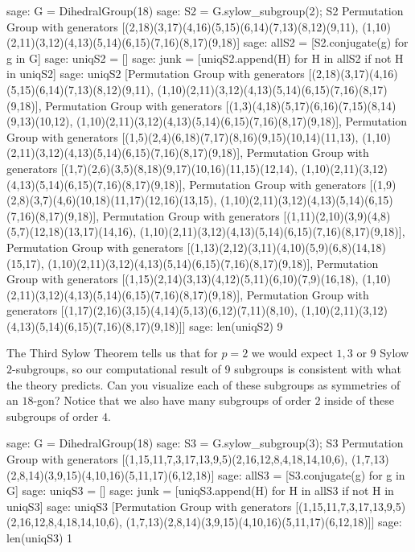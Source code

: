 \begin{sageexample}
sage: G = DihedralGroup(18)
sage: S2 = G.sylow_subgroup(2); S2
Permutation Group with generators
  [(2,18)(3,17)(4,16)(5,15)(6,14)(7,13)(8,12)(9,11),
   (1,10)(2,11)(3,12)(4,13)(5,14)(6,15)(7,16)(8,17)(9,18)]
sage: allS2 = [S2.conjugate(g) for g in G]
sage: uniqS2 = []
sage: junk = [uniqS2.append(H) for H in allS2 if not H in uniqS2]
sage: uniqS2
[Permutation Group with generators
   [(2,18)(3,17)(4,16)(5,15)(6,14)(7,13)(8,12)(9,11),
    (1,10)(2,11)(3,12)(4,13)(5,14)(6,15)(7,16)(8,17)(9,18)],
 Permutation Group with generators
   [(1,3)(4,18)(5,17)(6,16)(7,15)(8,14)(9,13)(10,12),
    (1,10)(2,11)(3,12)(4,13)(5,14)(6,15)(7,16)(8,17)(9,18)],
 Permutation Group with generators
   [(1,5)(2,4)(6,18)(7,17)(8,16)(9,15)(10,14)(11,13),
    (1,10)(2,11)(3,12)(4,13)(5,14)(6,15)(7,16)(8,17)(9,18)],
 Permutation Group with generators
   [(1,7)(2,6)(3,5)(8,18)(9,17)(10,16)(11,15)(12,14),
    (1,10)(2,11)(3,12)(4,13)(5,14)(6,15)(7,16)(8,17)(9,18)],
 Permutation Group with generators
   [(1,9)(2,8)(3,7)(4,6)(10,18)(11,17)(12,16)(13,15),
    (1,10)(2,11)(3,12)(4,13)(5,14)(6,15)(7,16)(8,17)(9,18)],
 Permutation Group with generators
   [(1,11)(2,10)(3,9)(4,8)(5,7)(12,18)(13,17)(14,16),
    (1,10)(2,11)(3,12)(4,13)(5,14)(6,15)(7,16)(8,17)(9,18)],
 Permutation Group with generators
   [(1,13)(2,12)(3,11)(4,10)(5,9)(6,8)(14,18)(15,17),
    (1,10)(2,11)(3,12)(4,13)(5,14)(6,15)(7,16)(8,17)(9,18)],
 Permutation Group with generators
   [(1,15)(2,14)(3,13)(4,12)(5,11)(6,10)(7,9)(16,18),
    (1,10)(2,11)(3,12)(4,13)(5,14)(6,15)(7,16)(8,17)(9,18)],
 Permutation Group with generators
   [(1,17)(2,16)(3,15)(4,14)(5,13)(6,12)(7,11)(8,10),
    (1,10)(2,11)(3,12)(4,13)(5,14)(6,15)(7,16)(8,17)(9,18)]]
sage: len(uniqS2)
9
\end{sageexample}
%
The Third Sylow Theorem tells us that for $p=2$ we would expect $1, 3\text{ or }9$ Sylow $2$-subgroups, so our computational result of 9 subgroups is consistent with what the theory predicts.  Can you visualize each of these subgroups as symmetries of an $18$-gon?  Notice that we also have many subgroups of order $2$ inside of these subgroups of order $4$.
%
\begin{sageexample}
sage: G = DihedralGroup(18)
sage: S3 = G.sylow_subgroup(3); S3
Permutation Group with generators
[(1,15,11,7,3,17,13,9,5)(2,16,12,8,4,18,14,10,6),
(1,7,13)(2,8,14)(3,9,15)(4,10,16)(5,11,17)(6,12,18)]
sage: allS3 = [S3.conjugate(g) for g in G]
sage: uniqS3 = []
sage: junk = [uniqS3.append(H) for H in allS3 if not H in uniqS3]
sage: uniqS3
[Permutation Group with generators
   [(1,15,11,7,3,17,13,9,5)(2,16,12,8,4,18,14,10,6),
    (1,7,13)(2,8,14)(3,9,15)(4,10,16)(5,11,17)(6,12,18)]]
sage: len(uniqS3)
1
\end{sageexample}
